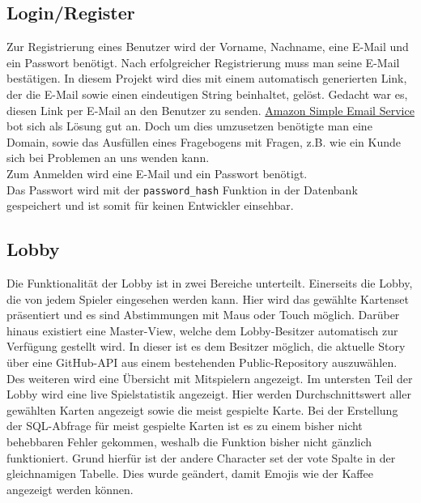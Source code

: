 \subsection{Login/Register}\label{subsec:login/register}
Zur Registrierung eines Benutzer wird der Vorname, Nachname, eine E-Mail und ein Passwort benötigt. Nach erfolgreicher Registrierung muss man seine E-Mail bestätigen. In diesem Projekt wird dies mit einem automatisch generierten Link, der die E-Mail sowie einen eindeutigen String beinhaltet, gelöst. Gedacht war es, diesen Link per E-Mail an den Benutzer zu senden. \href{https://aws.amazon.com/de/ses/}{Amazon Simple Email Service} bot sich als Lösung gut an. Doch um dies umzusetzen benötigte man eine Domain, sowie das Ausfüllen eines Fragebogens mit Fragen, z.B. wie ein Kunde sich bei Problemen an uns wenden kann.\\
Zum Anmelden wird eine E-Mail und ein Passwort benötigt.\\
Das Passwort wird mit der \lstinline{password_hash} Funktion in der Datenbank gespeichert und ist somit für keinen Entwickler einsehbar.

\subsection{Lobby}\label{subsec:lobby}
Die Funktionalität der Lobby ist in zwei Bereiche unterteilt. Einerseits die Lobby, die von jedem Spieler eingesehen werden kann. Hier wird das gewählte Kartenset präsentiert und es sind Abstimmungen mit Maus oder Touch möglich. Darüber hinaus existiert eine Master-View, welche dem Lobby-Besitzer automatisch zur Verfügung gestellt wird. In dieser ist es dem Besitzer möglich, die aktuelle Story über eine GitHub-API aus einem bestehenden Public-Repository auszuwählen. Des weiteren wird eine Übersicht mit Mitspielern angezeigt. Im untersten Teil der Lobby wird eine live Spielstatistik angezeigt. Hier werden Durchschnittswert aller gewählten Karten angezeigt sowie die meist gespielte Karte. Bei der Erstellung der SQL-Abfrage für meist gespielte Karten ist es zu einem bisher nicht behebbaren Fehler gekommen, weshalb die Funktion bisher nicht gänzlich funktioniert. Grund hierfür ist der andere Character set der vote Spalte in der gleichnamigen Tabelle. Dies wurde geändert, damit Emojis wie der Kaffee angezeigt werden können. 